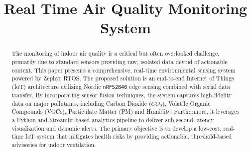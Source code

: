 \documentclass[conference]{IEEEtran}
\begin{document}
\title{Real Time Air Quality Monitoring System
\\
}

\author{
\and
{}
\and
{}
}

\maketitle

\begin{abstract}
The monitoring of indoor air quality is a critical but often overlooked challenge, primarily due to standard sensors providing raw, isolated data devoid of actionable context. 
This paper presents a comprehensive, real-time environmental sensing system powered by Zephyr RTOS. 
The proposed solution is an end-to-end Internet of Things (IoT) architecture utilizing Nordic \texttt{nRF52840} edge sensing combined with serial data transfer. 
By incorporating sensor fusion techniques, the system captures high-fidelity data on major pollutants, including Carbon Dioxide ($CO_2$), Volatile Organic Compounds (VOCs), Particulate Matter (PM) and Humidity. 
Furthermore, it leverages a Python and Streamlit-based analytics pipeline to deliver sub-second latency visualization and dynamic alerts. 
The primary objective is to develop a low-cost, real-time IoT system that mitigates health risks by providing actionable, threshold-based advisories for indoor ventilation.
\end{abstract}
\end{document}
